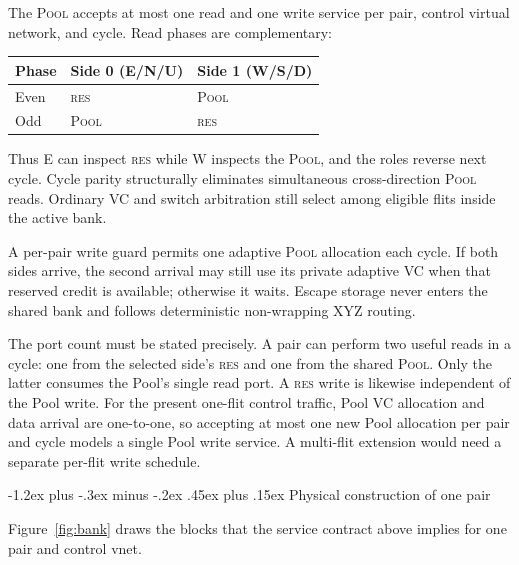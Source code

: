 \documentclass[10pt,twocolumn]{article}
\makeatletter
\newcommand{\res}{\textsc{res}\xspace}
\newcommand{\pool}{\textsc{Pool}\xspace}
\renewcommand\subsection{\@startsection{subsection}{2}{\z@}%
  {-1.2ex plus -.3ex minus -.2ex}%
  {.45ex plus .15ex}%
  {\normalfont\normalsize\bfseries}}
\makeatother
\begin{document}
The \pool accepts at most one read and one write service per pair, control
virtual network, and cycle. Read phases are complementary:
\begin{center}
\small
\begin{tabular}{lll}
\toprule
Phase & Side 0 (E/N/U) & Side 1 (W/S/D)\\
\midrule
Even & \res & \pool\\
Odd  & \pool & \res\\
\bottomrule
\end{tabular}
\end{center}
Thus E can inspect \res while W inspects the \pool, and the roles reverse next
cycle. Cycle parity structurally eliminates simultaneous cross-direction
\pool reads. Ordinary VC and switch arbitration still select among eligible
flits inside the active bank.

A per-pair write guard permits one adaptive \pool allocation each cycle. If
both sides arrive, the second arrival may still use its private adaptive VC
when that reserved credit is available; otherwise it waits. Escape storage
never enters the shared bank and follows deterministic non-wrapping XYZ
routing.

The port count must be stated precisely. A pair can perform two useful reads
in a cycle: one from the selected side's \res and one from the shared \pool.
Only the latter consumes the Pool's single read port. A \res write is likewise
independent of the Pool write. For the present one-flit control traffic, Pool
VC allocation and data arrival are one-to-one, so accepting at most one new
Pool allocation per pair and cycle models a single Pool write service. A
multi-flit extension would need a separate per-flit write schedule.

\subsection{Physical construction of one pair}
\label{sec:physical}

Figure~\ref{fig:bank} draws the blocks that the service contract above
implies for one pair and control vnet.
\end{document}
